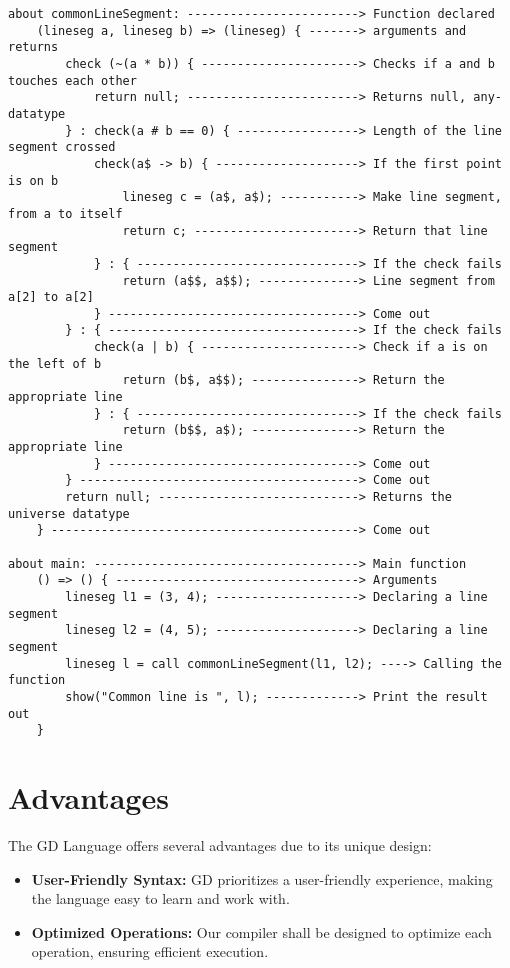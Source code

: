\documentclass{article}
\begin{document}
\begin{enumerate}
\begin{verbatim}
about commonLineSegment: ------------------------> Function declared
    (lineseg a, lineseg b) => (lineseg) { -------> arguments and returns
        check (~(a * b)) { ----------------------> Checks if a and b touches each other
            return null; ------------------------> Returns null, any-datatype
        } : check(a # b == 0) { -----------------> Length of the line segment crossed
            check(a$ -> b) { --------------------> If the first point is on b
                lineseg c = (a$, a$); -----------> Make line segment, from a to itself
                return c; -----------------------> Return that line segment
            } : { -------------------------------> If the check fails
                return (a$$, a$$); --------------> Line segment from a[2] to a[2]
            } -----------------------------------> Come out
        } : { -----------------------------------> If the check fails
            check(a | b) { ----------------------> Check if a is on the left of b
                return (b$, a$$); ---------------> Return the appropriate line
            } : { -------------------------------> If the check fails
                return (b$$, a$); ---------------> Return the appropriate line
            } -----------------------------------> Come out
        } ---------------------------------------> Come out
        return null; ----------------------------> Returns the universe datatype
    } -------------------------------------------> Come out

about main: -------------------------------------> Main function
    () => () { ----------------------------------> Arguments
        lineseg l1 = (3, 4); --------------------> Declaring a line segment
        lineseg l2 = (4, 5); --------------------> Declaring a line segment
        lineseg l = call commonLineSegment(l1, l2); ----> Calling the function
        show("Common line is ", l); -------------> Print the result out
    }
\end{verbatim}

\end{enumerate}

\section{Advantages}
The GD Language offers several advantages due to its unique design:

\begin{itemize}
    \item \textbf{User-Friendly Syntax:} GD prioritizes a user-friendly experience, making the language easy to learn and work with.

    \item \textbf{Optimized Operations:} Our compiler shall be designed to optimize each operation, ensuring efficient execution.

\end{itemize}
\end{document}
